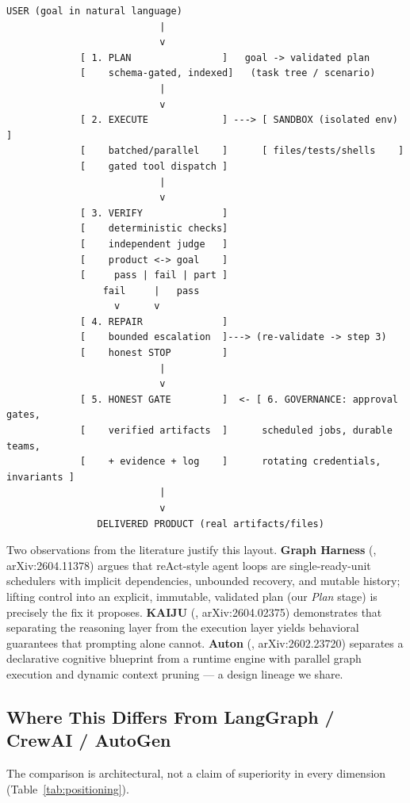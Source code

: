 \documentclass[11pt]{article}
\begin{document}
\begin{lstlisting}[basicstyle=\ttfamily\footnotesize,frame=single,breaklines]
                USER (goal in natural language)
                           |
                           v
             [ 1. PLAN                ]   goal -> validated plan
             [    schema-gated, indexed]   (task tree / scenario)
                           |
                           v
             [ 2. EXECUTE             ] ---> [ SANDBOX (isolated env) ]
             [    batched/parallel    ]      [ files/tests/shells    ]
             [    gated tool dispatch ]
                           |
                           v
             [ 3. VERIFY              ]
             [    deterministic checks]
             [    independent judge   ]
             [    product <-> goal    ]
             [     pass | fail | part ]
                 fail     |   pass
                   v      v
             [ 4. REPAIR              ]
             [    bounded escalation  ]---> (re-validate -> step 3)
             [    honest STOP         ]
                           |
                           v
             [ 5. HONEST GATE         ]  <- [ 6. GOVERNANCE: approval gates,
             [    verified artifacts  ]      scheduled jobs, durable teams,
             [    + evidence + log    ]      rotating credentials, invariants ]
                           |
                           v
                DELIVERED PRODUCT (real artifacts/files)
\end{lstlisting}

Two observations from the literature justify this layout. \textbf{Graph Harness}
(\cite{graphhs}, arXiv:2604.11378) argues that reAct-style agent loops are
single-ready-unit schedulers
with implicit dependencies, unbounded recovery, and mutable history; lifting control into
an explicit, immutable, validated plan (our \emph{Plan} stage) is precisely the fix it
proposes. \textbf{KAIJU} (\cite{kaiju}, arXiv:2604.02375) demonstrates that separating the
reasoning
layer from the execution layer yields behavioral guarantees that prompting alone cannot.
\textbf{Auton} (\cite{auton}, arXiv:2602.23720) separates a declarative cognitive blueprint
from a
runtime engine with parallel graph execution and dynamic context pruning --- a design
lineage we share.

\subsection{Where This Differs From LangGraph / CrewAI / AutoGen}
The comparison is architectural, not a claim of superiority in every dimension
(Table~\ref{tab:positioning}).
\end{document}
